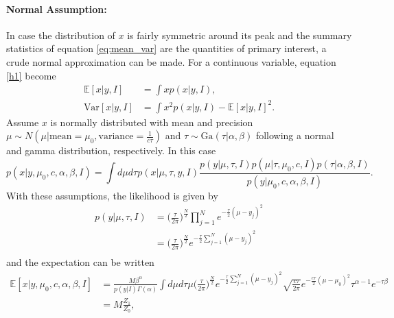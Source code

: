 \begin{example}
	\paragraph{Normal Assumption:} In case the distribution of $x$ is fairly symmetric around its peak and the summary statistics of equation \eqref{eq:mean_var} are the quantities of primary interest, a crude normal approximation can be made. For a continuous variable, equation \eqref{h1} become		
	\begin{equation}
		\begin{split}
			\mathbb{E}[x|y,I] &= \int xp(x|y,I),\\
			\text{Var}[x|y,I] &=  \int x^2p(x|y,I)-\mathbb{E}[x|y,I]^2.
		\end{split}
		\label{h1con}
	\end{equation}
	Assume $x$ is normally distributed with mean and precision $\mu\sim N(\mu|\text{mean}=\mu_0,\text{variance}=\frac{1}{c\tau})$ and $\tau\sim \text{Ga}(\tau|\alpha,\beta)$ following a normal and gamma distribution, respectively. In this case
	\begin{equation}
		p(x|y,\mu_0,c,\alpha,\beta,I) = \int d\mu  d\tau p(x|\mu,\tau,y,I)\frac{p(y|\mu,\tau,I)p(\mu|\tau,\mu_0,c,I)p(\tau|\alpha,\beta,I)}{p(y|\mu_0,c,\alpha,\beta,I)}.
		\label{h6}
	\end{equation}
	With these assumptions, the likelihood is given by
	\begin{equation}
		\begin{split}
			p(y|\mu,\tau,I) &= \bigg(\frac{\tau}{2\pi}\bigg)^{\frac{N}{2}}\prod_{j=1}^{N}e^{-\frac{\tau}{2}(\mu-y_j)^2}\\
			&=\bigg(\frac{\tau}{2\pi}\bigg)^{\frac{N}{2}}e^{-\frac{\tau}{2}\sum_{j=1}^{N}(\mu-y_j)^2}\\
		\end{split}
	\end{equation}
	and the expectation can be written
	\begin{equation}
		\begin{split}
			\mathbb{E}[x|y,\mu_0,c,\alpha,\beta,I] &=\frac{M\beta^{\alpha}}{p(y|I)\Gamma(\alpha)}\int d\mu d\tau \mu \bigg(\frac{\tau}{2\pi}\bigg)^{\frac{N}{2}}e^{-\frac{\tau}{2}\sum_{j=1}^{N}(\mu-y_j)^2}\sqrt{\frac{c\tau}{2\pi}}e^{-\frac{c\tau}{2}(\mu-\mu_0)^2}\tau^{\alpha-1}e^{-\tau \beta}\\
			&=M\frac{Z_1}{Z_0},\\
		\end{split}
		\label{h11}

\end{equation}
\end{example}
